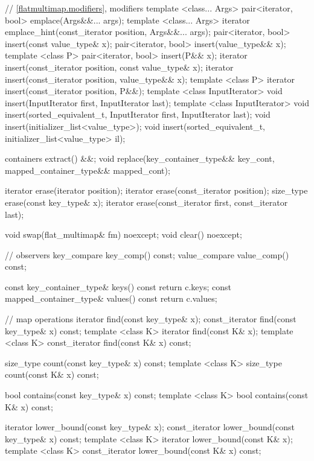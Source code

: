 \begin{codeblock}
\begin{codeblock}
\begin{codeblock}
\begin{addedblock}
\begin{codeblock}
{{      // \ref{flatmultimap.modifiers}, modifiers
      template <class... Args> pair<iterator, bool> emplace(Args&&... args);
      template <class... Args>
        iterator emplace_hint(const_iterator position, Args&&... args);
      pair<iterator, bool> insert(const value_type& x);
      pair<iterator, bool> insert(value_type&& x);
      template <class P> pair<iterator, bool> insert(P&& x);
      iterator insert(const_iterator position, const value_type& x);
      iterator insert(const_iterator position, value_type&& x);
      template <class P>
        iterator insert(const_iterator position, P&&);
      template <class InputIterator>
        void insert(InputIterator first, InputIterator last);
      template <class InputIterator>
        void insert(sorted_equivalent_t, InputIterator first, InputIterator last);
      void insert(initializer_list<value_type>);
      void insert(sorted_equivalent_t, initializer_list<value_type> il);

      containers extract() &&;
      void replace(key_container_type&& key_cont, mapped_container_type&& mapped_cont);

      iterator erase(iterator position);
      iterator erase(const_iterator position);
      size_type erase(const key_type& x);
      iterator erase(const_iterator first, const_iterator last);

      void swap(flat_multimap& fm) noexcept;
      void clear() noexcept;

      // observers
      key_compare key_comp() const;
      value_compare value_comp() const;

      const key_container_type& keys() const      { return c.keys; }
      const mapped_container_type& values() const { return c.values; }

      // map operations
      iterator find(const key_type& x);
      const_iterator find(const key_type& x) const;
      template <class K> iterator find(const K& x);
      template <class K> const_iterator find(const K& x) const;

      size_type count(const key_type& x) const;
      template <class K> size_type count(const K& x) const;

      bool contains(const key_type& x) const;
      template <class K> bool contains(const K& x) const;

      iterator lower_bound(const key_type& x);
      const_iterator lower_bound(const key_type& x) const;
      template <class K> iterator lower_bound(const K& x);
      template <class K> const_iterator lower_bound(const K& x) const;

}}
\end{codeblock}
\end{addedblock}
\end{codeblock}
\end{codeblock}
\end{codeblock}
